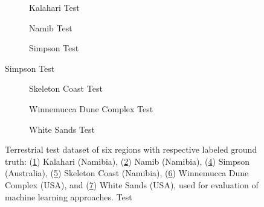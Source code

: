 \begin{figure}
	\centering
	\begin{subfigure}{\textwidth}
		\centering
		\caption{ Kalahari Test }
		\label{fig:kalahari_test_image}
	\end{subfigure}
	\begin{subfigure}{\textwidth}
		\centering
		\caption{ Namib Test }
		\label{fig:namib_test_image}
	\end{subfigure}
	\begin{subfigure}{\textwidth}
		\centering
		\caption{ Simpson Test }
		\label{fig:simpson_test_image}
	\end{subfigure}
\end{figure}
\begin{figure}
	\ContinuedFloat
	\centering
	\begin{subfigure}{\textwidth}
		\centering
		\caption{ Skeleton Coast Test }
		\label{fig:skeleton_coast_test_image}
	\end{subfigure}
	\begin{subfigure}{\textwidth}
		\centering
		\caption{ Winnemucca Dune Complex Test }
		\label{fig:wdc_test_image}
	\end{subfigure}
	\begin{subfigure}{\textwidth}
		\centering
		\caption{ White Sands Test }
		\label{fig:white_sands_test_image}
	\end{subfigure}
	\caption{Terrestrial test dataset of six regions with respective labeled ground truth: (\ref{fig:kalahari_test_image}) Kalahari (Namibia), (\ref{fig:namib_test_image}) Namib (Namibia), (\ref{fig:simpson_test_image}) Simpson (Australia), (\ref{fig:skeleton_coast_test_image}) Skeleton Coast (Namibia), (\ref{fig:wdc_test_image}) Winnemucca Dune Complex (USA), and (\ref{fig:white_sands_test_image}) White Sands (USA), used for evaluation of machine learning approaches. Test }
	\label{fig:terrestrial_test_dataset}
\end{figure}

